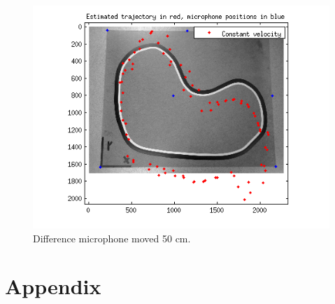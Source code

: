 \documentclass[10pt,a4paper]{report}
\begin{document}
\begin{figure}[H]
\begin{center}
  \includegraphics[width = 350pt]{sens_diff50.png}
  \caption{Difference microphone moved 50 cm.}
  \label{diff_50}
  \end{center}
\end{figure}

\newpage
\chapter{Appendix}
\end{document}
